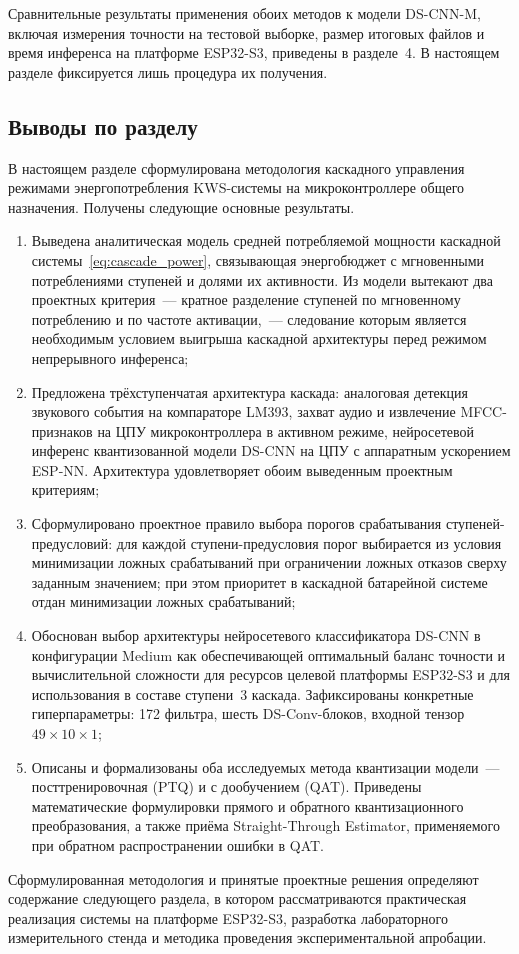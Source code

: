 Сравнительные результаты применения обоих методов к модели DS-CNN-M,
включая измерения точности на тестовой выборке, размер итоговых файлов
и время инференса на платформе ESP32-S3, приведены в разделе~4. В
настоящем разделе фиксируется лишь процедура их получения.

\subsection{Выводы по разделу}

В настоящем разделе сформулирована методология каскадного управления
режимами энергопотребления KWS-системы на микроконтроллере общего
назначения. Получены следующие основные результаты.

\begin{enumerate}
	\item Выведена аналитическая модель средней потребляемой мощности
	      каскадной системы~\eqref{eq:cascade_power}, связывающая
	      энергобюджет с мгновенными потреблениями ступеней и долями их
	      активности. Из модели вытекают два проектных
	      критерия~--- кратное разделение ступеней по мгновенному
	      потреблению и по частоте активации,~--- следование которым
	      является необходимым условием выигрыша каскадной архитектуры
	      перед режимом непрерывного инференса;
	\item Предложена трёхступенчатая архитектура каскада: аналоговая
	      детекция звукового события на компараторе LM393, захват аудио
	      и извлечение MFCC-признаков на ЦПУ микроконтроллера в активном
	      режиме, нейросетевой инференс квантизованной модели DS-CNN на
	      ЦПУ с аппаратным ускорением ESP-NN. Архитектура удовлетворяет
	      обоим выведенным проектным критериям;
	\item Сформулировано проектное правило выбора порогов
	      срабатывания ступеней-предусловий: для каждой ступени-предусловия
	      порог выбирается из условия минимизации ложных срабатываний при
	      ограничении ложных отказов сверху заданным значением; при этом
	      приоритет в каскадной батарейной системе отдан минимизации
	      ложных срабатываний;
	\item Обоснован выбор архитектуры нейросетевого классификатора
	      DS-CNN в конфигурации Medium как обеспечивающей оптимальный
	      баланс точности и вычислительной сложности для ресурсов
	      целевой платформы ESP32-S3 и для использования в составе
	      ступени~3 каскада. Зафиксированы конкретные гиперпараметры:
	      172 фильтра, шесть DS-Conv-блоков, входной тензор
	      $49 \times 10 \times 1$;
	\item Описаны и формализованы оба исследуемых метода
	      квантизации модели~--- посттренировочная (PTQ) и с дообучением
	      (QAT). Приведены математические формулировки прямого и обратного
	      квантизационного преобразования, а также приёма Straight-Through
	      Estimator, применяемого при обратном распространении ошибки в
	      QAT.
\end{enumerate}

Сформулированная методология и принятые проектные решения определяют
содержание следующего раздела, в котором рассматриваются практическая
реализация системы на платформе ESP32-S3, разработка лабораторного
измерительного стенда и методика проведения экспериментальной апробации.
